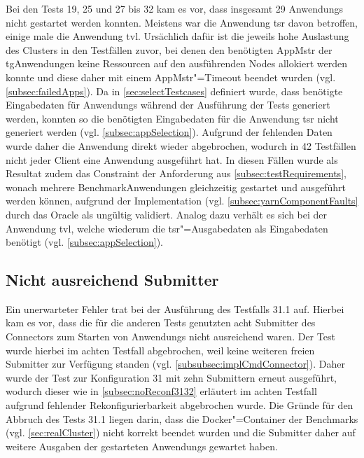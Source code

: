 Bei den \glspl{Test} 19, 25 und 27 bis 32 kam es vor, dass insgesamt 29 \glspl{Anwendung} nicht gestartet werden konnten.
Meistens war die \gls{Anwendung} \acrlong{tsr} davon betroffen, einige male die \gls{Anwendung} \acrlong{tvl}.
Ursächlich dafür ist die jeweils hohe Auslastung des Clusters in den Testfällen zuvor, bei denen den benötigten \gls{AppMstr} der \acrlong{tg}\gls{Anwendung}en keine Ressourcen auf den ausführenden Nodes allokiert werden konnte und diese daher mit einem \gls{AppMstr}"=Timeout beendet wurden (vgl. \cref{subsec:failedApps}).
Da in \cref{sec:selectTestcases} definiert wurde, dass benötigte Eingabedaten für \glspl{Anwendung} während der Ausführung der \glspl{Test} generiert werden, konnten so die benötigten Eingabedaten für die \gls{Anwendung} \acrlong{tsr} nicht generiert werden (vgl. \cref{subsec:appSelection}).
Aufgrund der fehlenden Daten wurde daher die \gls{Anwendung} direkt wieder abgebrochen, wodurch in 42 Testfällen nicht jeder Client eine \gls{Anwendung} ausgeführt hat.
In diesen Fällen wurde als Resultat zudem das Constraint der Anforderung aus \cref{subsec:testRequirements}, wonach mehrere Benchmark\gls{Anwendung}en gleichzeitig gestartet und ausgeführt werden können, aufgrund der Implementation (vgl. \cref{subsec:yarnComponentFaults} durch das Oracle als ungültig validiert.
Analog dazu verhält es sich bei der \gls{Anwendung} \acrlong{tvl}, welche wiederum die \acrlong{tsr}"=Ausgabedaten als Eingabedaten benötigt (vgl. \cref{subsec:appSelection}).

\subsection{Nicht ausreichend Submitter}
\label{subsec:notEnoughSubmitter}

Ein unerwarteter Fehler trat bei der Ausführung des Testfalls 31.1 auf.
Hierbei kam es vor, dass die für die anderen \glspl{Test} genutzten acht Submitter des Connectors zum Starten von \glspl{Anwendung} nicht ausreichend waren.
Der \gls{Test} wurde hierbei im achten \gls{Testfall} abgebrochen, weil keine weiteren freien Submitter zur Verfügung standen (vgl. \cref{subsubsec:implCmdConnector}).
Daher wurde der \gls{Test} zur Konfiguration 31 mit zehn Submittern erneut ausgeführt, wodurch dieser wie in \cref{subsec:noReconf3132} erläutert im achten \gls{Testfall} aufgrund fehlender Rekonfigurierbarkeit abgebrochen wurde.
Die Gründe für den Abbruch des \glspl{Test} 31.1 liegen darin, dass die Docker"=Container der Benchmarks (vgl. \cref{sec:realCluster}) nicht korrekt beendet wurden und die Submitter daher auf weitere Ausgaben der gestarteten \glspl{Anwendung} gewartet haben.
